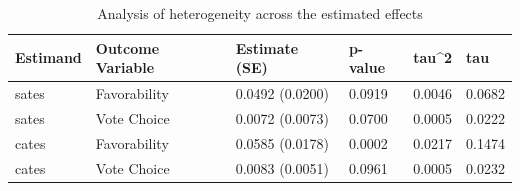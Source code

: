 \begin{table}[!h]
\centering
\caption{Analysis of heterogeneity across the estimated effects}
\centering
\begin{tabular}[t]{llllll}
\toprule
Estimand & Outcome Variable & Estimate (SE) & p-value & tau\textasciicircum{}2 & tau\\
\midrule
sates & Favorability & 0.0492 (0.0200) & 0.0919 & 0.0046 & 0.0682\\
sates & Vote Choice & 0.0072 (0.0073) & 0.0700 & 0.0005 & 0.0222\\
cates & Favorability & 0.0585 (0.0178) & 0.0002 & 0.0217 & 0.1474\\
cates & Vote Choice & 0.0083 (0.0051) & 0.0961 & 0.0005 & 0.0232\\
\bottomrule
\end{tabular}
\end{table}
